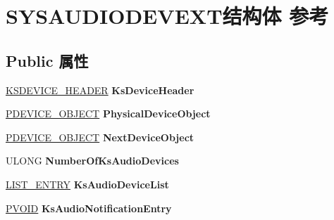 \hypertarget{struct_s_y_s_a_u_d_i_o_d_e_v_e_x_t}{}\section{S\+Y\+S\+A\+U\+D\+I\+O\+D\+E\+V\+E\+X\+T结构体 参考}
\label{struct_s_y_s_a_u_d_i_o_d_e_v_e_x_t}
\subsection*{Public 属性}
\begin{DoxyCompactItemize}
\item 
\mbox{\label{struct_s_y_s_a_u_d_i_o_d_e_v_e_x_t_a4bb4f0b8b607b5ae667f7430c9976d9a}} 
\hyperlink{interfacevoid}{K\+S\+D\+E\+V\+I\+C\+E\+\_\+\+H\+E\+A\+D\+ER} {\bfseries Ks\+Device\+Header}
\item 
\mbox{\label{struct_s_y_s_a_u_d_i_o_d_e_v_e_x_t_ace51bd199036037cd8e2d8e8479b30e4}} 
\hyperlink{struct___d_e_v_i_c_e___o_b_j_e_c_t}{P\+D\+E\+V\+I\+C\+E\+\_\+\+O\+B\+J\+E\+CT} {\bfseries Physical\+Device\+Object}
\item 
\mbox{\label{struct_s_y_s_a_u_d_i_o_d_e_v_e_x_t_a963662202dc0a02d157247fda9c90e2e}} 
\hyperlink{struct___d_e_v_i_c_e___o_b_j_e_c_t}{P\+D\+E\+V\+I\+C\+E\+\_\+\+O\+B\+J\+E\+CT} {\bfseries Next\+Device\+Object}
\item 
\mbox{\label{struct_s_y_s_a_u_d_i_o_d_e_v_e_x_t_ac00279498e290fcbbacc1004a04f1e9c}} 
U\+L\+O\+NG {\bfseries Number\+Of\+Ks\+Audio\+Devices}
\item 
\mbox{\label{struct_s_y_s_a_u_d_i_o_d_e_v_e_x_t_a887d4295fc5032fac6ab13798a1a6866}} 
\hyperlink{struct___l_i_s_t___e_n_t_r_y}{L\+I\+S\+T\+\_\+\+E\+N\+T\+RY} {\bfseries Ks\+Audio\+Device\+List}
\item 
\mbox{\label{struct_s_y_s_a_u_d_i_o_d_e_v_e_x_t_a5dec3e1653d5b257d4779f8718b5f8d5}} 
\hyperlink{interfacevoid}{P\+V\+O\+ID} {\bfseries Ks\+Audio\+Notification\+Entry}
\item 
\mbox{\label{struct_s_y_s_a_u_d_i_o_d_e_v_e_x_t_a582f107ce8cefecee1e3941352b73972}} 

\end{DoxyCompactItemize}
